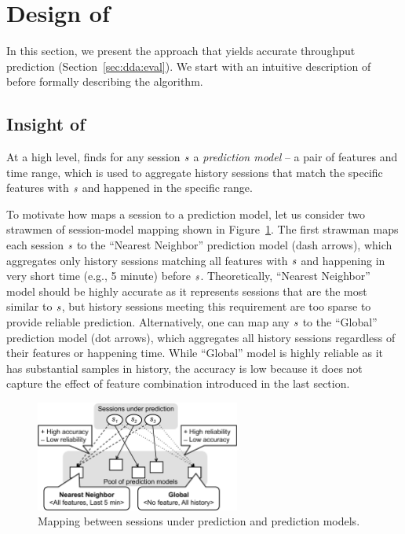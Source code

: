 \section{Design of \name}
\label{sec:dda:design}

In this section, we present the \name approach that yields accurate throughput prediction (Section~\ref{sec:dda:eval}). 
We start with an intuitive description of \name before formally describing the algorithm.



\subsection{Insight of \name}

At a high level, \name finds for any session $\mathit{s}$ a {\em prediction model} -- a pair of features and time range, which is used to aggregate history sessions that match the specific features with $\mathit{s}$ and happened in the specific range. 

To motivate how \name maps a session to a prediction model, let us consider two strawmen of session-model mapping shown in Figure~\ref{fig:tbd-motivation}. 
The first strawman maps each session $\mathit{s}$ to the ``Nearest Neighbor'' prediction model (dash arrows), which aggregates only history sessions matching all features with $\mathit{s}$ and happening in very short time (e.g., 5 minute) before $\mathit{s}$. Theoretically, ``Nearest Neighbor'' model should be highly accurate as it represents sessions that are the most similar to $\mathit{s}$, but history sessions meeting this requirement are too sparse to provide reliable prediction. 
Alternatively, one can map any $\mathit{s}$ to the ``Global'' prediction model (dot arrows), which aggregates all history sessions regardless of their features or happening time. While ``Global'' model is highly reliable as it has substantial samples in history, the accuracy is low because it does not capture the effect of feature combination introduced in the last section. 


\begin{figure}[t!]
\centering
\includegraphics[width=0.6\textwidth]{figures/dda-tbd-motivation.pdf}
\caption{Mapping between sessions under prediction and prediction models.}
\label{fig:tbd-motivation}
\end{figure}

